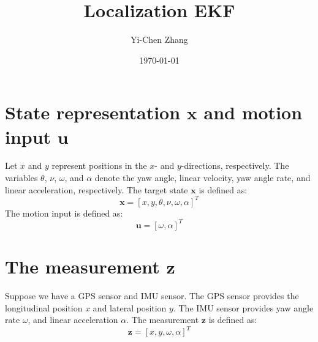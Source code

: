 \documentclass[12pt, a4paper]{article}
\title{Localization EKF}
\author{Yi-Chen Zhang}
\date{\today}
\begin{document}
\maketitle

\section{State representation $\bm{x}$ and motion input $\bm{u}$}
Let $x$ and $y$ represent positions in the $x$- and $y$-directions, respectively. The variables $\theta$, $\nu$, $\omega$, and $\alpha$ denote the yaw angle, linear velocity, yaw angle rate, and linear acceleration, respectively. The target state $\bm{x}$ is defined as:
\[
  \bm{x} = [x, y, \theta, \nu, \omega, \alpha]^{T}
\]
The motion input is defined as:
\[
  \bm{u} = [\omega, \alpha]^{T}
\]

\section{The measurement $\bm{z}$}
Suppose we have a GPS sensor and IMU sensor. The GPS sensor provides the longitudinal position $x$ and lateral position $y$. The IMU sensor provides yaw angle rate $\omega$, and linear acceleration $\alpha$. The measurement $\bm{z}$ is defined as:
\[
  \bm{z} = [x, y, \omega, \alpha]^{T}
\]
\end{document}
